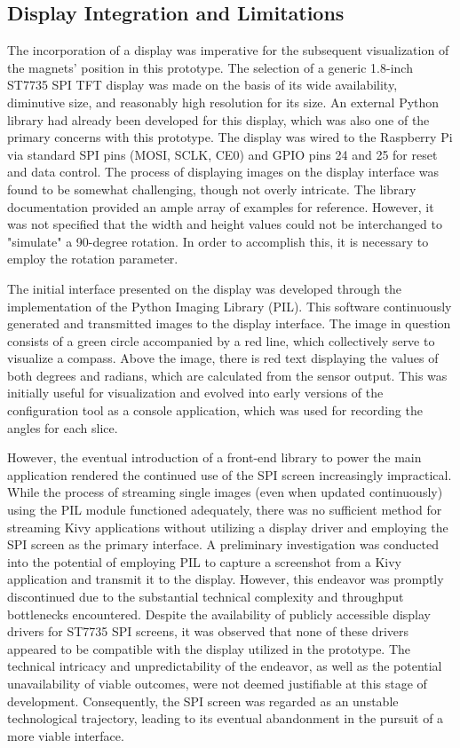 	\subsection{Display Integration and Limitations}
	The incorporation of a display was imperative for the subsequent visualization of the magnets' position in this prototype. The selection of a generic 1.8-inch ST7735 SPI TFT display was made on the basis of its wide availability, diminutive size, and reasonably high resolution for its size. An external Python library had already been developed for this display, which was also one of the primary concerns with this prototype. The display was wired to the Raspberry Pi via standard SPI pins (MOSI, SCLK, CE0) and GPIO pins 24 and 25 for reset and data control.
	The process of displaying images on the display interface was found to be somewhat challenging, though not overly intricate. The library documentation provided an ample array of examples for reference. However, it was not specified that the width and height values could not be interchanged to "simulate" a 90-degree rotation. In order to accomplish this, it is necessary to employ the rotation parameter.
	
	The initial interface presented on the display was developed through the implementation of the Python Imaging Library (PIL). This software continuously generated and transmitted images to the display interface. The image in question consists of a green circle accompanied by a red line, which collectively serve to visualize a compass. Above the image, there is red text displaying the values of both degrees and radians, which are calculated from the sensor output. This was initially useful for visualization and evolved into early versions of the configuration tool as a console application, which was used for recording the angles for each slice.
	
	However, the eventual introduction of a front-end library to power the main application rendered the continued use of the SPI screen increasingly impractical. While the process of streaming single images (even when updated continuously) using the PIL module functioned adequately, there was no sufficient method for streaming Kivy applications without utilizing a display driver and employing the SPI screen as the primary interface. A preliminary investigation was conducted into the potential of employing PIL to capture a screenshot from a Kivy application and transmit it to the display. However, this endeavor was promptly discontinued due to the substantial technical complexity and throughput bottlenecks encountered. Despite the availability of publicly accessible display drivers for ST7735 SPI screens, it was observed that none of these drivers appeared to be compatible with the display utilized in the prototype. The technical intricacy and unpredictability of the endeavor, as well as the potential unavailability of viable outcomes, were not deemed justifiable at this stage of development. Consequently, the SPI screen was regarded as an unstable technological trajectory, leading to its eventual abandonment in the pursuit of a more viable interface.
	
